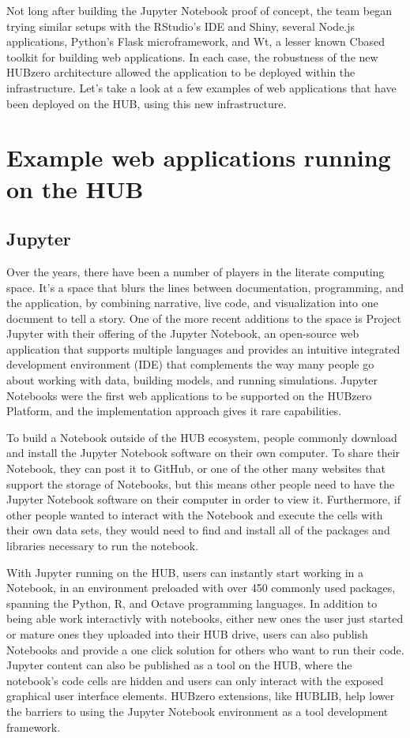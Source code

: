 \documentclass[conference]{../sty/IEEEtran}
\newcommand\CC{C\nolinebreak[4]\hspace{-.05em}\raisebox{.4ex}{\relsize{-3}{\textbf{++}}}\hspace{.25em}}
\begin{document}
Not long after building the Jupyter Notebook proof of concept, the team began
trying similar setups with the RStudio's IDE and Shiny, several Node.js
applications, Python's Flask microframework, and Wt, a lesser known \CC based
toolkit for building web applications. In each case, the robustness of the new
HUBzero architecture allowed the application to be deployed within the
infrastructure. Let's take a look at a few examples of web applications that
have been deployed on the HUB, using this new infrastructure.

\section {Example web applications running on the HUB}

\subsection {Jupyter}

Over the years, there have been a number of players in the literate computing
space. It's a space that blurs the lines between documentation, programming,
and the application, by combining narrative, live code, and visualization into
one document to tell a story. One of the more recent additions to the space is
Project Jupyter with their offering of the Jupyter Notebook, an open-source web
application that supports multiple languages and provides an intuitive
integrated development environment (IDE) that complements the way many people
go about working with data, building models, and running simulations.  Jupyter
Notebooks were the first web applications to be supported on the HUBzero
Platform, and the implementation approach gives it rare capabilities.

To build a Notebook outside of the HUB ecosystem, people commonly download and
install the Jupyter Notebook software on their own computer. To share their
Notebook, they can post it to GitHub, or one of the other many websites that
support the storage of Notebooks, but this means other people need to have the
Jupyter Notebook software on their computer in order to view it. Furthermore,
if other people wanted to interact with the Notebook and execute the cells with
their own data sets, they would need to find and install all of the packages
and libraries necessary to run the notebook.

With Jupyter running on the HUB, users can instantly start working in a
Notebook, in an environment preloaded with over 450 commonly used packages,
spanning the Python, R, and Octave programming languages. In addition to being
able work interactivly with notebooks, either new ones the user just started or
mature ones they uploaded into their HUB drive, users can also publish
Notebooks and provide a one click solution for others who want to run their
code.
Jupyter content can also be published as a tool on the HUB, where the
notebook's code cells are hidden and users can only interact with the exposed
graphical user interface elements. HUBzero extensions, like HUBLIB, help lower
the barriers to using the Jupyter Notebook environment as a tool development
framework.
\end{document}
